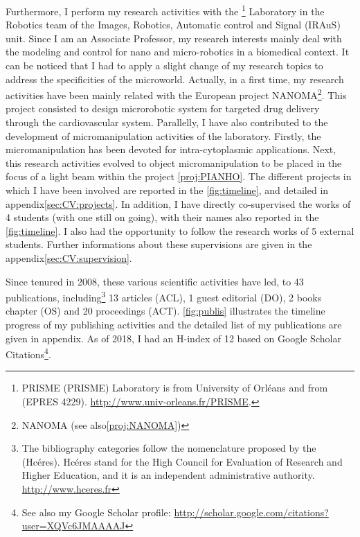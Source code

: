 Furthermore, I perform my research activities with the \PRISMEshort\footnote{{\acrlong{PRISME}} (PRISME) Laboratory is from  University of Orléans  and from \INSAshort \CVL (EPRES 4229). \url{http://www.univ-orleans.fr/PRISME}.}  
Laboratory in the Robotics team of the Images, Robotics, Automatic control and Signal (IRAuS) unit.
Since I am an Associate Professor, my research interests mainly deal with the modeling and control for nano and micro-robotics in a biomedical context.
It can be noticed that I had to apply a slight change of my research topics  to address the specificities of the microworld.
Actually, in a first time, my research activities have been mainly related with the European project \acrshort{NANOMA}\footnote{\acrlong{NANOMA} (see also\;\protect\ref{proj:NANOMA})}.
This project consisted to design microrobotic system for targeted drug delivery through the cardiovascular system.
Parallelly, I have also contributed to the development of micromanipulation activities of the laboratory.
Firstly, the micromanipulation has been devoted for intra-cytoplasmic applications\cite{2011_icra_kim,2012_tase_kim}.
Next, this research activities evolved to object micromanipulation to be placed in the focus of a light beam within the \ANRshort project \PIANHOfoot\ref{proj:PIANHO}.
The different projects in which I have been involved are reported in the \autoref{fig:timeline}, and detailed in appendix\;\ref{sec:CV:projects}.
In addition, I have directly co-supervised the works of 4 \PhD students (with one still on going), with their names also reported in the \autoref{fig:timeline}.
I also  had the opportunity to follow the research works of 5 external \PhD students. 
Further informations about these supervisions are given in the appendix\;\ref{sec:CV:supervision}.

Since tenured in 2008, these various scientific activities have led,  to 43 publications, including\footnote{The bibliography categories follow the nomenclature proposed by the  (Hcéres)\cite{2018_hceres}.
Hcéres stand for the High Council for Evaluation of Research and Higher Education, and it is an independent administrative authority.  \url{http://www.hceres.fr}} 13 articles (ACL), 1 guest editorial (DO), 2 books chapter (OS) and 20 proceedings (ACT).
\autoref{fig:publis} illustrates the timeline progress of my publishing activities and the detailed list of my publications are given in appendix\;\RefAnnexeRef. 
As of 2018, I had an H-index of 12 based on Google Scholar Citations\footnote{See also my Google Scholar profile: \url{http://scholar.google.com/citations?user=XQVc6JMAAAAJ}}. 

